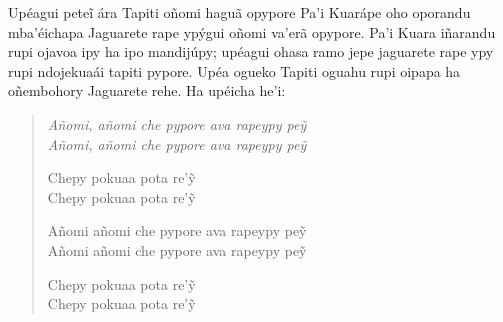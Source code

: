 Upéagui peteĩ ára Tapiti oñomi haguã opypore Pa'i Kuarápe oho oporandu
mba'éichapa Jaguarete rape ypýgui oñomi va'erã opypore. Pa'i Kuara
iñarandu rupi ojavoa ipy ha ipo mandijúpy; upéagui ohasa ramo jepe
jaguarete rape ypy rupi ndojekuaái tapiti pypore. Upéa ogueko Tapiti
oguahu rupi oipapa ha oñembohory Jaguarete rehe. Ha upéicha he'i:

\begin{verse}
\itshape
Añomi, añomi che pypore ava rapeypy peỹ\\
Añomi, añomi che pypore ava rapeypy peỹ

Chepy pokuaa pota re'ỹ\\
Chepy pokuaa pota re'ỹ

Añomi añomi che pypore ava rapeypy peỹ\\
Añomi añomi che pypore ava rapeypy peỹ

Chepy pokuaa pota re'ỹ\\
Chepy pokuaa pota re'ỹ
\end{verse}
